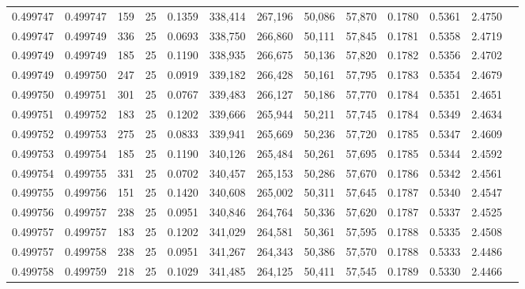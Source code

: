 \begin{tabular}{rrrrrrrrrrrrr}
0.499747 & 0.499747 & 159 &  25 &                                     0.1359 & 338,414 & 267,196 &  50,086 &  57,870 & 0.1780 & 0.5361 & 2.4750 \\
0.499747 & 0.499749 & 336 &  25 &                                     0.0693 & 338,750 & 266,860 &  50,111 &  57,845 & 0.1781 & 0.5358 & 2.4719 \\
0.499749 & 0.499749 & 185 &  25 &                                     0.1190 & 338,935 & 266,675 &  50,136 &  57,820 & 0.1782 & 0.5356 & 2.4702 \\
0.499749 & 0.499750 & 247 &  25 &                                     0.0919 & 339,182 & 266,428 &  50,161 &  57,795 & 0.1783 & 0.5354 & 2.4679 \\
0.499750 & 0.499751 & 301 &  25 &                                     0.0767 & 339,483 & 266,127 &  50,186 &  57,770 & 0.1784 & 0.5351 & 2.4651 \\
0.499751 & 0.499752 & 183 &  25 &                                     0.1202 & 339,666 & 265,944 &  50,211 &  57,745 & 0.1784 & 0.5349 & 2.4634 \\
0.499752 & 0.499753 & 275 &  25 &                                     0.0833 & 339,941 & 265,669 &  50,236 &  57,720 & 0.1785 & 0.5347 & 2.4609 \\
0.499753 & 0.499754 & 185 &  25 &                                     0.1190 & 340,126 & 265,484 &  50,261 &  57,695 & 0.1785 & 0.5344 & 2.4592 \\
0.499754 & 0.499755 & 331 &  25 &                                     0.0702 & 340,457 & 265,153 &  50,286 &  57,670 & 0.1786 & 0.5342 & 2.4561 \\
0.499755 & 0.499756 & 151 &  25 &                                     0.1420 & 340,608 & 265,002 &  50,311 &  57,645 & 0.1787 & 0.5340 & 2.4547 \\
0.499756 & 0.499757 & 238 &  25 &                                     0.0951 & 340,846 & 264,764 &  50,336 &  57,620 & 0.1787 & 0.5337 & 2.4525 \\
0.499757 & 0.499757 & 183 &  25 &                                     0.1202 & 341,029 & 264,581 &  50,361 &  57,595 & 0.1788 & 0.5335 & 2.4508 \\
0.499757 & 0.499758 & 238 &  25 &                                     0.0951 & 341,267 & 264,343 &  50,386 &  57,570 & 0.1788 & 0.5333 & 2.4486 \\
0.499758 & 0.499759 & 218 &  25 &                                     0.1029 & 341,485 & 264,125 &  50,411 &  57,545 & 0.1789 & 0.5330 & 2.4466 \\

\end{tabular}
